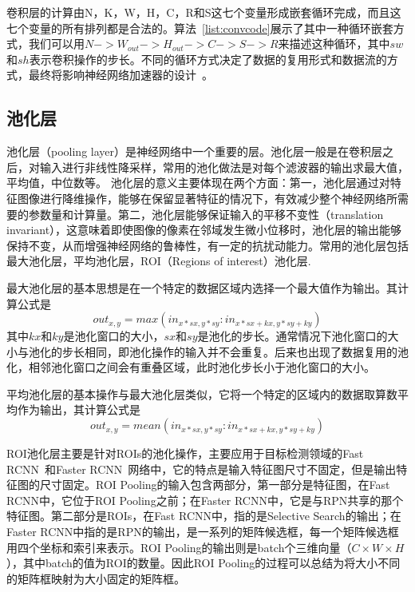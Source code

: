 卷积层的计算由N，K，W，H，C，R和S这七个变量形成嵌套循环完成，而且这七个变量的所有排列都是合法的。算法~\ref{list:convcode}展示了其中一种循环嵌套方式，我们可以用$N->W_{out}->H_{out}->C->S->R$来描述这种循环，其中$sw$和$sh$表示卷积操作的步长。不同的循环方式决定了数据的复用形式和数据流的方式，最终将影响神经网络加速器的设计~\cite{angshuman2017scnn}。

\subsection{池化层}
池化层（pooling layer）是神经网络中一个重要的层。池化层一般是在卷积层之后，对输入进行非线性降采样，常用的池化做法是对每个滤波器的输出求最大值，平均值，中位数等。
池化层的意义主要体现在两个方面：第一，池化层通过对特征图像进行降维操作，能够在保留显著特征的情况下，有效减少整个神经网络所需要的参数量和计算量。第二，池化层能够保证输入的平移不变性（translation invariant），这意味着即使图像的像素在邻域发生微小位移时，池化层的输出能够保持不变，从而增强神经网络的鲁棒性，有一定的抗扰动能力。常用的池化层包括最大池化层，平均池化层，ROI（Regions of interest）池化层.

最大池化层的基本思想是在一个特定的数据区域内选择一个最大值作为输出。其计算公式是
\begin{equation}
out_{x,y} = max(in_{x*sx,y*sy}:in_{x*sx+kx,y*sy+ky})
\end{equation}
其中$kx$和$ky$是池化窗口的大小，$sx$和$sy$是池化的步长。通常情况下池化窗口的大小与池化的步长相同，即池化操作的输入并不会重复。后来也出现了数据复用的池化，相邻池化窗口之间会有重叠区域，此时池化步长小于池化窗口的大小。


平均池化层的基本操作与最大池化层类似，它将一个特定的区域内的数据取算数平均作为输出，其计算公式是
\begin{equation}
out_{x,y}=mean(in_{x*sx,y*sy}:in_{x*sx+kx,y*sy+ky})
\end{equation}

ROI池化层主要是针对ROIs的池化操作，主要应用于目标检测领域的Fast RCNN~\cite{girshick2014rich}和Faster RCNN~\cite{ren2015faster}网络中，它的特点是输入特征图尺寸不固定，但是输出特征图的尺寸固定。ROI Pooling的输入包含两部分，第一部分是特征图，在Fast RCNN中，它位于ROI Pooling之前；在Faster RCNN中，它是与RPN共享的那个特征图。第二部分是ROIs，在Fast RCNN中，指的是Selective Search的输出；在Faster RCNN中指的是RPN的输出，是一系列的矩阵候选框，每一个矩阵候选框用四个坐标和索引来表示。ROI Pooling的输出则是batch个三维向量（$C \times W\times H$），其中batch的值为ROI的数量。因此ROI Pooling的过程可以总结为将大小不同的矩阵框映射为大小固定的矩阵框。
 

